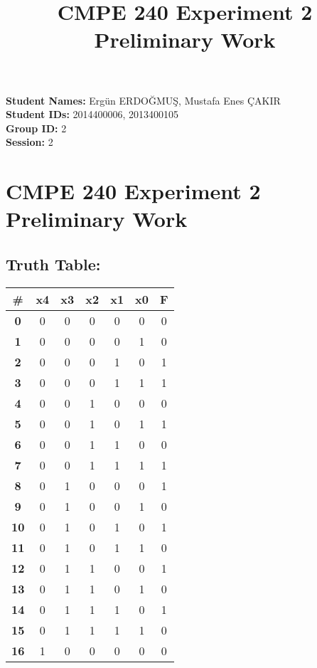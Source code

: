 \documentclass[12pt,a4paper]{report}
\title{CMPE 240 Experiment 2 Preliminary Work}
\begin{document}
\noindent
\textbf{Student Names:} Ergün ERDOĞMUŞ, Mustafa Enes ÇAKIR \\
\textbf{Student IDs:} 2014400006, 2013400105 \\
\textbf{Group ID:} 2 \\
\textbf{Session:} 2

\section*{CMPE 240 Experiment 2 Preliminary Work}

\subsection*{Truth Table:}

\begin{center}
  \begin{tabular}{|c|c|c|c|c|c|c|}
    \hline
    \textbf{\#} & \textbf{x4} & \textbf{x3} &\textbf{x2} & \textbf{x1} & \textbf{x0} & \textbf{F } \\
    \hline
    \textbf{0} & 0 & 0 & 0 & 0 & 0 & 0 \\
    \hline
    \textbf{1} & 0 & 0 & 0 & 0 & 1 & 0 \\
    \hline
    \textbf{2} & 0 & 0 & 0 & 1 & 0 & 1 \\
    \hline
    \textbf{3} & 0 & 0 & 0 & 1 & 1 & 1 \\
    \hline
    \textbf{4} & 0 & 0 & 1 & 0 & 0 & 0 \\
    \hline
    \textbf{5} & 0 & 0 & 1 & 0 & 1 & 1 \\
    \hline
    \textbf{6} & 0 & 0 & 1 & 1 & 0 & 0 \\
    \hline
    \textbf{7} & 0 & 0 & 1 & 1 & 1 & 1 \\
    \hline
    \textbf{8} & 0 & 1 & 0 & 0 & 0 & 1 \\
    \hline
    \textbf{9} & 0 & 1 & 0 & 0 & 1 & 0 \\
    \hline
    \textbf{10} & 0 & 1 & 0 & 1 & 0 & 1 \\
    \hline
    \textbf{11} & 0 & 1 & 0 & 1 & 1 & 0 \\
    \hline
    \textbf{12} & 0 & 1 & 1 & 0 & 0 & 1 \\
    \hline
    \textbf{13} & 0 & 1 & 1 & 0 & 1 & 0 \\
    \hline
    \textbf{14} & 0 & 1 & 1 & 1 & 0 & 1 \\
    \hline
    \textbf{15} & 0 & 1 & 1 & 1 & 1 & 0 \\
    \hline
    \textbf{16} & 1 & 0 & 0 & 0 & 0 & 0 \\

\end{tabular}
\end{center}
\end{document}
